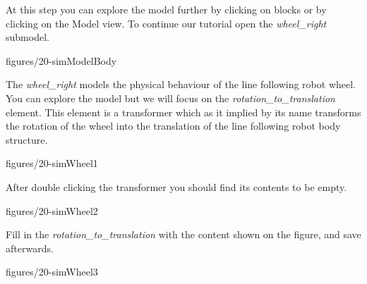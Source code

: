 \documentclass[11pt,a4paper]{../tutorial}
\begin{document}
\begin{instructions}
\item At this step you can explore the model further by clicking on blocks or
	by clicking on the Model view. To continue our tutorial open the
	\emph{wheel\_right} submodel.

    \begin{annotation}[width=0.8\linewidth]{figures/20-simModelBody}
    \end{annotation}

\newpage

\item The \emph{wheel\_right} models the physical behaviour of the line
	following robot wheel. You can explore the model but we will focus on
	the \emph{rotation\_to\_translation} element. This element is a
	transformer which as it implied by its name transforms the rotation of
	the wheel into the translation of the line following robot body
	structure.  

    \begin{annotation}[width=0.8\linewidth]{figures/20-simWheel1}
    \end{annotation}

\item After double clicking the transformer you should find its contents to be empty.

    \begin{annotation}[width=0.7\linewidth]{figures/20-simWheel2}
    \end{annotation}

\newpage

\item Fill in the \emph{rotation\_to\_translation} with the content shown on the figure, and save afterwards.

    \begin{annotation}[width=0.8\linewidth]{figures/20-simWheel3}
	    
    \end{annotation}

\end{instructions}
\end{document}
